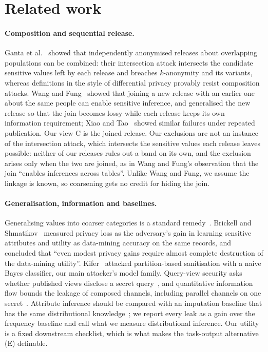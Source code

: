 \documentclass[11pt]{article}
\begin{document}
\section{Related work}
\label{sec:related}

\paragraph{Composition and sequential release.} Ganta et al.~\cite{ganta2008composition} showed that independently anonymised releases about overlapping populations can be combined: their intersection attack intersects the candidate sensitive values left by each release and breaches $k$-anonymity and its variants, whereas definitions in the style of differential privacy provably resist composition attacks. Wang and Fung~\cite{wang2006sequential} showed that joining a new release with an earlier one about the same people can enable sensitive inference, and generalised the new release so that the join becomes lossy while each release keeps its own information requirement; Xiao and Tao~\cite{xiao2007minvariance} showed similar failures under repeated publication. Our view C is the joined release. Our exclusions are not an instance of the intersection attack, which intersects the sensitive values each release leaves possible: neither of our releases rules out a band on its own, and the exclusion arises only when the two are joined, as in Wang and Fung's observation that the join ``enables inferences across tables''. Unlike Wang and Fung, we assume the linkage is known, so coarsening gets no credit for hiding the join.

\paragraph{Generalisation, information and baselines.} Generalising values into coarser categories is a standard remedy~\cite{samarati2001protecting,sweeney2002generalization}. Brickell and Shmatikov~\cite{brickell2008cost} measured privacy loss as the adversary's gain in learning sensitive attributes and utility as data-mining accuracy on the same records, and concluded that ``even modest privacy gains require almost complete destruction of the data-mining utility''. Kifer~\cite{kifer2009definetti} attacked partition-based sanitisation with a naive Bayes classifier, our main attacker's model family. Query-view security asks whether published views disclose a secret query~\cite{miklau2004formal}, and quantitative information flow bounds the leakage of composed channels, including parallel channels on one secret~\cite{kawamoto2017compositionality}. Attribute inference should be compared with an imputation baseline that has the same distributional knowledge~\cite{jayaraman2022imputation}; we report every leak as a gain over the frequency baseline and call what we measure distributional inference. Our utility is a fixed downstream checklist, which is what makes the task-output alternative (E) definable.
\end{document}
